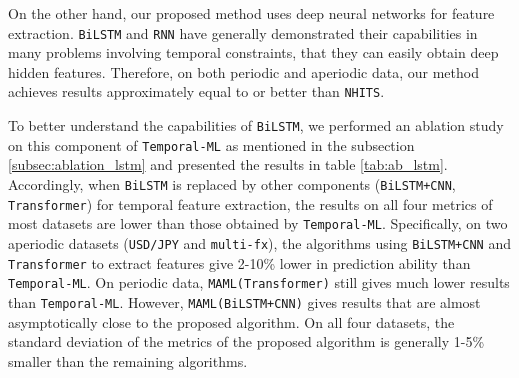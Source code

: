 
On the other hand, our proposed method uses deep neural networks for feature extraction. \verb|BiLSTM| and \verb|RNN| have generally demonstrated their capabilities in many problems involving temporal constraints, that they can easily obtain deep hidden features. Therefore, on both periodic and aperiodic data, our method achieves results approximately equal to or better than \verb|NHITS|.


To better understand the capabilities of \verb|BiLSTM|, we performed an ablation study on this component of \verb|Temporal-ML| as mentioned in the subsection \ref{subsec:ablation_lstm} and presented the results in table \ref{tab:ab_lstm}. Accordingly, when \verb|BiLSTM| is replaced by other components (\verb|BiLSTM+CNN|, \verb|Transformer|) for temporal feature extraction, the results on all four metrics of most datasets are lower than those obtained by \verb|Temporal-ML|. Specifically, on two aperiodic datasets (\verb|USD/JPY| and \verb|multi-fx|), the algorithms using \verb|BiLSTM+CNN| and \verb|Transformer| to extract features give 2-10\% lower in prediction ability than \verb|Temporal-ML|. On periodic data, \verb|MAML(Transformer)| still gives much lower results than \verb|Temporal-ML|. However, \verb|MAML(BiLSTM+CNN)| gives results that are almost asymptotically close to the proposed algorithm. On all four datasets, the standard deviation of the metrics of the proposed algorithm is generally 1-5\% smaller than the remaining algorithms.

